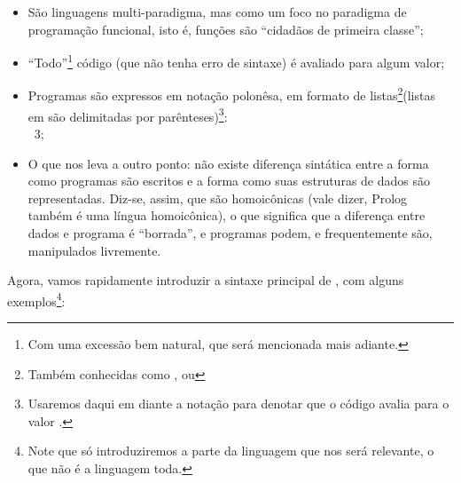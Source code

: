 \documentclass{article}
\begin{document}
\begin{itemize}
\item São linguagens multi-paradigma, mas como um
  foco no paradigma de programação funcional, isto é,
  funções são ``cidadãos de primeira classe'';
\item ``Todo''\footnote{Com uma excessão bem
    natural, que será mencionada mais adiante.} código
   (que não tenha erro de sintaxe) é avaliado para
  algum valor;
\item Programas são expressos em notação polonêsa, em formato de
  listas\footnote{Também conhecidas como , ou
    }(listas em  são delimitadas por
  parênteses)\footnote{Usaremos daqui em diante a notação
     para denotar que o código
     avalia para o valor .}:
  \\
   \seta\ 3;
\item O que nos leva a outro ponto: não existe diferença
  sintática entre a forma como programas  são escritos
  e a forma como suas estruturas de dados são representadas. Diz-se,
  assim, que  são homoicônicas (vale dizer, Prolog
  também é uma língua homoicônica), o que significa que a diferença
  entre dados e programa é ``borrada'', e programas podem, e
  frequentemente são, manipulados livremente.
\end{itemize}

Agora, vamos rapidamente introduzir a sintaxe principal de
, com alguns exemplos\footnote{Note que só
  introduziremos a parte da linguagem que nos será relevante, o que
  não é a linguagem toda.}:
\end{document}
